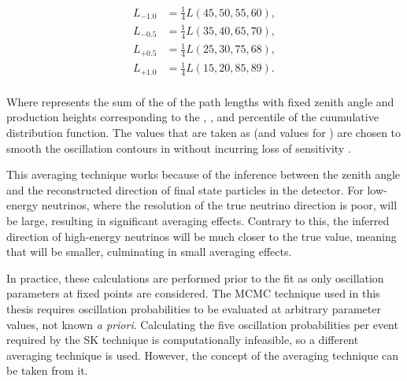 \begin{equation}
  \begin{split}
    L_{-1.0} &= \frac{1}{4} L(45,50,55,60), \\
    L_{-0.5} &= \frac{1}{4} L(35,40,65,70), \\
    L_{+0.5} &= \frac{1}{4} L(25,30,75,68), \\
    L_{+1.0} &= \frac{1}{4} L(15,20,85,89). \\
  \end{split}
\end{equation}

Where  represents the sum of the of the path lengths with fixed zenith angle and production heights corresponding to the , ,  and  percentile of the cuumulative distribution function. The values that are taken as \quickmath{\beta} (and values for ) are chosen to smooth the oscillation contours in  without incurring loss of sensitivity \cite{t2k_tn_425}.

This averaging technique works because of the inference between the zenith angle and the reconstructed direction of final state particles in the detector. For low-energy neutrinos, where the resolution of the true neutrino direction is poor,  will be large, resulting in significant averaging effects. Contrary to this, the inferred direction of high-energy neutrinos will be much closer to the true value, meaning that  will be smaller, culminating in small averaging effects.

In practice, these calculations are performed prior to the fit as only oscillation parameters at fixed points are considered. The MCMC technique used in this thesis requires oscillation probabilities to be evaluated at arbitrary parameter values, not known \textit{a priori}. Calculating the five oscillation probabilities per event required by the SK technique is computationally infeasible, so a different averaging technique is used. However, the concept of the averaging technique can be taken from it.


